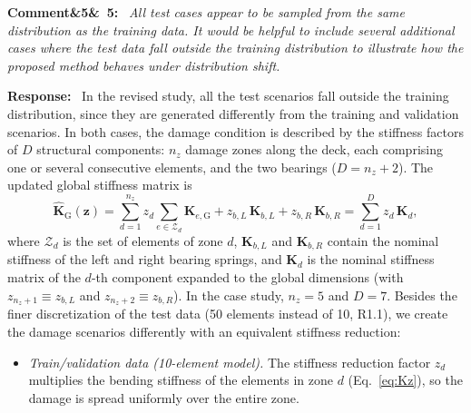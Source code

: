\documentclass[11pt]{article}
\newenvironment{rcomment}[1]{\par\bigskip\noindent\textbf{Comment\ifx&#1&\else\ #1\fi:}\ \itshape}{\par}
\newenvironment{response}{\par\smallskip\noindent\color{resp}\textbf{Response:}\ }{\par}
\newcommand{\z}{\mathbf{z}}
\begin{document}
\begin{rcomment}{5}
All test cases appear to be sampled from the same distribution as the training data. It would be helpful to include several additional cases where the test data fall outside the training distribution to illustrate how the proposed method behaves under distribution shift.
\end{rcomment}

\begin{response}
In the revised study, all the test scenarios fall outside the training distribution, since they are generated
differently from the training and validation scenarios. In both cases, the damage condition is described by the stiffness
factors of $D$ structural components: $n_z$ damage zones along the deck, each comprising one or several consecutive
elements, and the two bearings ($D=n_z+2$). The updated global stiffness matrix is
\begin{equation}
\hat{\mathbf{K}}_{\mathrm{G}}(\z)=\sum_{d=1}^{n_z} z_d\sum_{e\in\mathcal{Z}_d}\mathbf{K}_{e,\mathrm{G}}
+z_{b,L}\,\mathbf{K}_{b,L}+z_{b,R}\,\mathbf{K}_{b,R}=\sum_{d=1}^{D}z_d\,\mathbf{K}_d,
\label{eq:Kz}
\end{equation}
where $\mathcal{Z}_d$ is the set of elements of zone $d$, $\mathbf{K}_{b,L}$ and $\mathbf{K}_{b,R}$ contain the nominal
stiffness of the left and right bearing springs, and $\mathbf{K}_d$ is the nominal stiffness matrix of the $d$-th
component expanded to the global dimensions (with $z_{n_z+1}\equiv z_{b,L}$ and $z_{n_z+2}\equiv z_{b,R}$). In the case
study, $n_z=5$ and $D=7$. Besides the finer discretization of the test data (50 elements
instead of 10, R1.1), we create the damage scenarios differently with an equivalent stiffness reduction:
\begin{itemize}[leftmargin=*]
\item \emph{Train/validation data (10-element model).} The stiffness reduction factor $z_d$ multiplies the bending stiffness of the elements in zone $d$ (Eq.~\eqref{eq:Kz}), so the damage is spread uniformly over the entire zone. 


\end{itemize}
\end{response}
\end{document}
